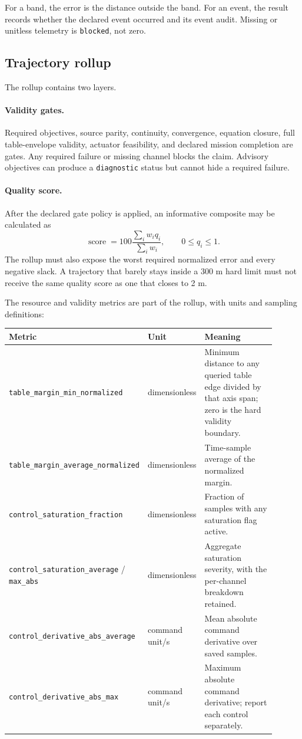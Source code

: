\documentclass[11pt]{article}
\begin{document}
For a band, the error is the distance outside the band. For an event, the
result records whether the declared event occurred and its event audit. Missing
or unitless telemetry is \texttt{blocked}, not zero.

\subsection{Trajectory rollup}

The rollup contains two layers.

\paragraph{Validity gates.} Required objectives, source parity, continuity,
convergence, equation closure, full table-envelope validity, actuator
feasibility, and declared mission completion are gates. Any required failure or
missing channel blocks the claim. Advisory objectives can produce a
\texttt{diagnostic} status but cannot hide a required failure.

\paragraph{Quality score.} After the declared gate policy is applied, an
informative composite may be calculated as
\[
  \operatorname{score}=100\frac{\sum_i w_i q_i}{\sum_i w_i},
  \qquad 0\leq q_i\leq1.
\]
The rollup must also expose the worst required normalized error and every
negative slack. A trajectory that barely stays inside a 300 m hard limit must
not receive the same quality score as one that closes to 2 m.

The resource and validity metrics are part of the rollup, with units and
sampling definitions:

{\small
\begin{longtable}{p{0.35\linewidth}p{0.2\linewidth}p{0.35\linewidth}}
\toprule
\textbf{Metric} & \textbf{Unit} & \textbf{Meaning}\\
\midrule
\endhead
\texttt{table\_margin\_min\_normalized} & dimensionless &
  Minimum distance to any queried table edge divided by that axis span; zero is
  the hard validity boundary.\\
\texttt{table\_margin\_average\_normalized} & dimensionless &
  Time-sample average of the normalized margin.\\
\texttt{control\_saturation\_fraction} & dimensionless &
  Fraction of samples with any saturation flag active.\\
\texttt{control\_saturation\_average} / \texttt{max\_abs} & dimensionless &
  Aggregate saturation severity, with the per-channel breakdown retained.\\
\texttt{control\_derivative\_abs\_average} & command unit/s &
  Mean absolute command derivative over saved samples.\\
\texttt{control\_derivative\_abs\_max} & command unit/s &
  Maximum absolute command derivative; report each control separately.\\
\bottomrule
\end{longtable}
}
\end{document}
